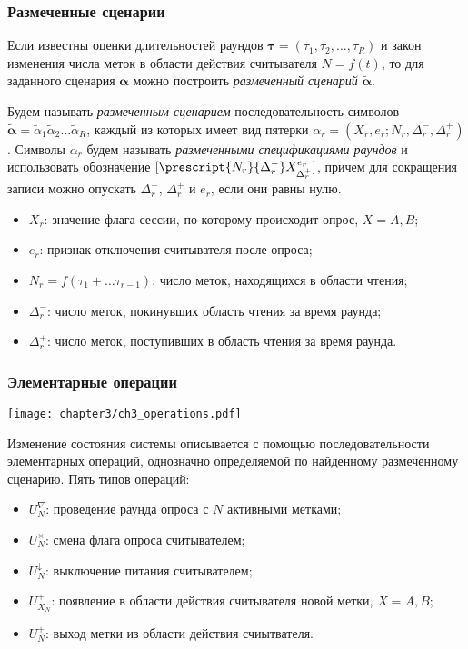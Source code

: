 \begin{frame}
    \frametitle{Размеченные сценарии}
    \small
    Если известны оценки длительностей раундов $\bm{\tau} = (\tau_1, \tau_2, \dots, \tau_R)$ и закон изменения числа меток в области действия считывателя $N = f(t)$, то для заданного сценария $\bm{\alpha}$ можно построить \textit{размеченный сценарий} $\widetilde{\bm{\alpha}}$.

    \small
    \begin{block}{}
        Будем называть \textit{размеченным сценарием} последовательность символов $\widetilde{\bm{\alpha}} = \widetilde{\alpha}_1 \widetilde{\alpha}_2 \dots \widetilde{\alpha}_R$, каждый из которых имеет вид пятерки $\alpha_r = (X_r, e_r ; N_r, \Delta^-_r, \Delta^+_r)$. Символы $\alpha_r$ будем называть \textit{размеченными спецификациями раундов} и использовать обозначение $[\prescript{N_r}{\Delta_r^-} X_{\Delta_r^+}^{e_r}]$, причем для сокращения записи можно опускать $\Delta_r^-$, $\Delta_r^+$ и $e_r$, если они равны нулю.
    \end{block}

    \footnotesize
    \begin{itemize}
        \item $X_r$: значение флага сессии, по которому происходит опрос, $X=A,B$;
        \item $e_r$: признак отключения считывателя после опроса;
        \item $N_r = f(\tau_1 + \dots \tau_{r-1})$: число меток, находящихся в области чтения;
        \item $\Delta^-_r$: число меток, покинувших область чтения за время раунда;
        \item $\Delta^+_r$: число меток, поступивших в область чтения за время раунда.
    \end{itemize}
\end{frame}

\begin{frame}
    \frametitle{Элементарные операции}
    \begin{center}
        \texttt{[image: chapter3/ch3\_operations.pdf]}
    \end{center}
    \small
    Изменение состояния системы описывается с помощью последовательности элементарных операций, однозначно определяемой по найденному размеченному сценарию. Пять типов операций:
    \footnotesize
    \begin{itemize}
        \item $U^\nabla_N$: проведение раунда опроса с $N$ активными метками;
        \item $U^\times_N$: смена флага опроса считывателем;
        \item $U^\downarrow_N$: выключение питания считывателем;
        \item $U^+_{X_N}$: появление в области действия считывателя новой метки, $X = A,B$;
        \item $U^+_N$: выход метки из области действия счиытвателя.
    \end{itemize}
\end{frame}

